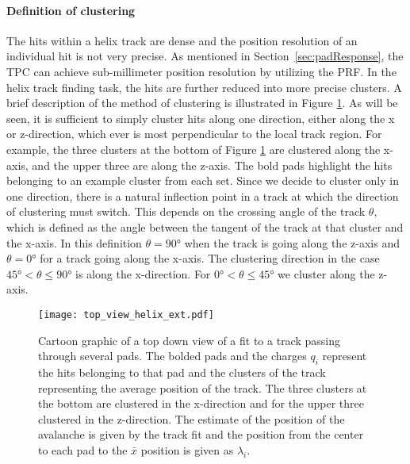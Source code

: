 \paragraph{Definition of clustering}
The hits within a helix track are dense and the position resolution of an individual hit is not very precise. As mentioned in Section~\ref{sec:padResponse}, the TPC can achieve sub-millimeter position resolution by utilizing the PRF. In the helix track finding task, the hits are further reduced into more precise clusters. A brief description of the method of clustering is illustrated in Figure \ref{fig:topview}. As will be seen, it is sufficient to simply cluster hits along one direction, either along the x or z-direction, which ever is most perpendicular to the local track region. For example, the three clusters at the bottom of Figure \ref{fig:topview} are clustered along the x-axis, and the upper three are along the z-axis. The bold pads highlight the hits belonging to an example cluster from each set. Since we decide to cluster only in one direction, there is a natural inflection point in a track at which the direction of clustering must switch. This depends on the crossing angle of the track $\theta$, which is defined as the angle between the tangent of the track  at that cluster and the x-axis. In this definition $\theta = \ang{90}$ when the track is going along the z-axis and $\theta = \ang{0}$ for a track going along the x-axis.  The clustering direction in the case $\ang{45} < \theta \leq \ang{90} $ is along the x-direction. For $\ang{0} < \theta \leq \ang{45}$ we cluster along the z-axis. 

 

\begin{figure}[!htb]
\centering
\texttt{[image: top\_view\_helix\_ext.pdf]}
\caption{Cartoon graphic of a top down view of a fit to a track passing through several pads. The bolded pads and the charges $q_i$ represent the hits belonging to that pad and the clusters of the track representing the average position of the track. The three clusters at the bottom are clustered in the x-direction and for the upper three clustered in the z-direction. The estimate of the position of the avalanche is given by the track fit and the position from the center to each pad to the $\bar{x}$ position is given as $\lambda_i$.}
\label{fig:topview}
\end{figure}

